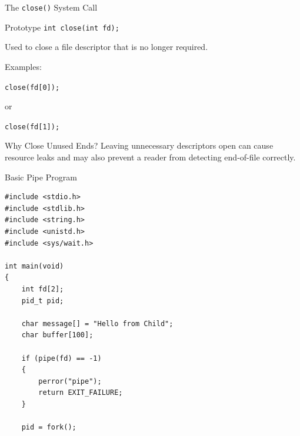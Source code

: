 \documentclass[aspectratio=169]{beamer}
\begin{document}
\begin{frame}{The \texttt{close()} System Call}

\begin{block}{Prototype}
\centering
\texttt{int close(int fd);}
\end{block}

Used to close a file descriptor that is no longer required.

Examples:

\begin{center}
\texttt{close(fd[0]);}
\end{center}

or

\begin{center}
\texttt{close(fd[1]);}
\end{center}

\begin{alertblock}{Why Close Unused Ends?}
Leaving unnecessary descriptors open can cause resource leaks and may also
prevent a reader from detecting end-of-file correctly.
\end{alertblock}

\end{frame}

\begin{frame}[fragile]{Basic Pipe Program}

\begin{lstlisting}[style=cstyle]
#include <stdio.h>
#include <stdlib.h>
#include <string.h>
#include <unistd.h>
#include <sys/wait.h>

int main(void)
{
    int fd[2];
    pid_t pid;

    char message[] = "Hello from Child";
    char buffer[100];

    if (pipe(fd) == -1)
    {
        perror("pipe");
        return EXIT_FAILURE;
    }

    pid = fork();
\end{lstlisting}

\end{frame}
\end{document}

